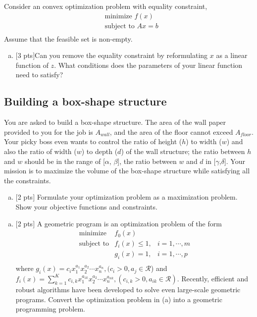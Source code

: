 \documentclass[12pt]{article}
\begin{document}
Consider an convex optimization problem with equality constraint,
\begin{eqnarray*}
&\text{minimize   } f(x)\\
&\text{subject to   } Ax = b\\
\end{eqnarray*}
Assume that the feasible set is non-empty.

\begin{enumerate}[(a)]
\item 
$[$3 pts$]$Can you remove the equality constraint by reformulating $x$ as a linear function of $z$. What conditions does the parameters of your linear function need to satisfy?
\end{enumerate}
\vspace{.25cm}

\subsection{Building a box-shape structure}
You are asked to build a box-shape structure. The area of the wall paper provided to you for the job is $A_{wall}$, and the area of the floor cannot exceed $A_{floor}$. Your picky boss even wants to control the ratio of height ($h$) to width ($w$) and also the ratio of width ($w$) to depth ($d$) of the wall structure; the ratio between $h$ and $w$ should be in the range of [$\alpha$, $\beta$], the ratio between $w$ and $d$ in [$\gamma$,$\delta$]. Your mission is to maximize the volume of the box-shape structure while satisfying all the constraints. 
\begin{enumerate}[(a)]
\item $[$2 pts$]$ Formulate your optimization problem as a maximization problem. Show your objective functions and constraints.
\end{enumerate}
\vspace{.25cm}

\begin{enumerate}[(b)]
\item $[$2 pts$]$ A geometric program is an optimization problem of the form
\begin{eqnarray*}
\text{minimize} & f_{0}(x) &\\
\text{subject to} & f_{i}(x) \leq 1, & i=1,\cdots,m\\
 & g_{i}(x) = 1, & i=1,\cdots,p\\
\end{eqnarray*}
where $g_{i}(x) = c_{i}x_{1}^{a_{1}}x_{2}^{a_{2}}\cdots x_{n}^{a_{n}}, (c_{i}>0, a_{j}\in \mathcal{R}$) and $f_{i}(x) = \sum_{k=1}^{K}c_{i,k}x_{1}^{a_{1k}}x_{2}^{a_{2}}\cdots x_{n}^{a_{nk}}, (c_{i,k}>0, a_{ik}\in \mathcal{R})$. Recently, efficient and robust algorithms have been developed to solve even large-scale geometric programs. Convert the optimization problem in (a) into a geometric programming problem.
\end{enumerate}
\vspace{.25cm}
\end{document}
